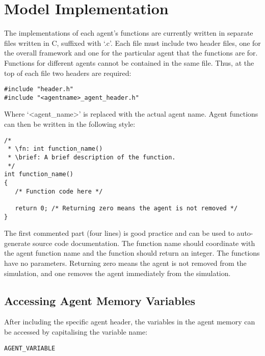 \section{Model Implementation}
\label{model_implementation}

The implementations of each agent's functions are currently written in separate
files written in C, suffixed with `.c'. Each file must include two
header files, one for the overall framework and one for the particular agent that the functions are for.
Functions for different agents cannot be contained in the same file.
Thus, at the top of each file two headers are required:

\begin{mylisting}
\begin{verbatim}
#include "header.h"
#include "<agentname>_agent_header.h"
\end{verbatim}
\end{mylisting}

Where `<agent\_name>' is replaced with the actual agent name.
Agent functions can then be written in the following style:

\begin{mylisting}
\begin{verbatim}
/*
 * \fn: int function_name()
 * \brief: A brief description of the function.
 */
int function_name()
{
   /* Function code here */

   return 0; /* Returning zero means the agent is not removed */
}
\end{verbatim}
\end{mylisting}

The first commented part (four lines) is good practice and can be used to
auto-generate source code documentation. The function name should coordinate
with the agent function name and the function should return an integer. The
functions have no parameters. Returning zero means the agent is not removed from
the simulation, and one removes the agent immediately from the simulation.

\subsection{Accessing Agent Memory Variables}

After including the specific agent header, the variables in the
agent memory can be accessed by capitalising the variable name:

\begin{mylisting}
\begin{verbatim}
AGENT_VARIABLE
\end{verbatim}
\end{mylisting}


